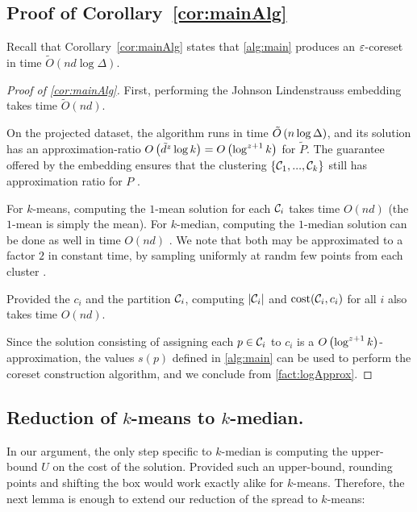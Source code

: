 \subsection{Proof of Corollary~\ref{cor:mainAlg}}
\label{ssec:cor_proof}
Recall that Corollary~\ref{cor:mainAlg} states that \cref{alg:main} produces an $\varepsilon$-coreset in time $\tilde O(nd \log \Delta)$.
\begin{proof}[Proof of \cref{cor:mainAlg}]
First, performing the Johnson Lindenstrauss embedding \cite{makarychev2019performance} takes time $\tilde O(nd)$.

On the projected dataset, the algorithm \fkmeans runs in time $\tilde O\left( n \log \Delta\right)$, and its solution has an approximation-ratio $O\left(
\tilde{d}^z \log k\right) = O\left(\log^{z+1} k\right)$ for $\tilde P$.  The guarantee offered by the embedding ensures that the clustering $\left\{
\mathcal C_1,...,\mathcal C_k\right\}$ still has approximation ratio for $P$ \cite{makarychev2019performance}. 

For $k$-means, computing the $1$-mean solution for each $\mathcal C_i$ takes time $O(nd)$ (the $1$-mean is simply the mean). 
For $k$-median, computing the $1$-median solution can be done as well in time $O(nd)$ \cite{CohenLMPS16}. 
We note that both may be approximated to a factor $2$ in constant time, by sampling uniformly at randm few points from each cluster \cite{neurips21}.

Provided the $c_i$ and the partition $\mathcal C_i$, computing $|\mathcal C_i|$ and $\operatorname{cost}(\mathcal C_i, c_i)$ for all $i$ also takes time $O(nd)$.

Since the solution consisting of assigning each $p \in \mathcal C_i$ to $c_i$ is a $O\left( \log^{z+1} k\right)$-approximation, the values $s(p)$ defined in
\cref{alg:main} can be used to perform the coreset construction algorithm, and we conclude from \cref{fact:logApprox}.

\end{proof}


\subsection{Reduction of $k$-means to $k$-median.}
\label{app:redKM}

In our argument, the only step specific to $k$-median is computing the upper-bound $U$ on the cost of the solution. Provided such an upper-bound, rounding
points and shifting the box would work exactly alike for $k$-means. Therefore, the next lemma is enough to extend our reduction of the spread to $k$-means:

